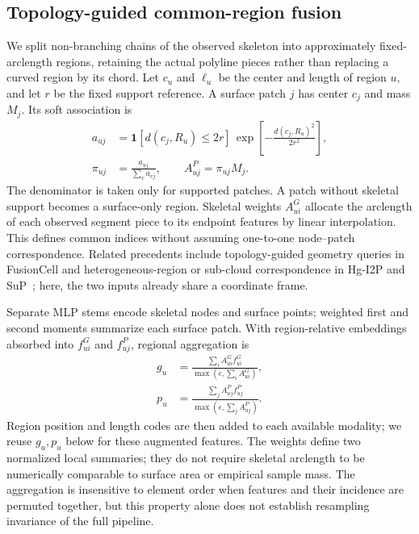 \subsection{Topology-guided common-region fusion}

We split non-branching chains of the observed skeleton into approximately fixed-arclength regions, retaining the actual polyline pieces rather than replacing a curved region by its chord. Let $c_u$ and $\ell_u$ be the center and length of region $u$, and let $r$ be the fixed support reference. A surface patch $j$ has center $c_j$ and mass $M_j$. Its soft association is
\begin{equation}
 \begin{aligned}
 a_{uj}&=\mathbf{1}[d(c_j,R_u)\leq 2r]\,
       \exp\!\left[-\frac{d(c_j,R_u)^2}{2r^2}\right],\\
 \pi_{uj}&=\frac{a_{uj}}{\sum_v a_{vj}},\qquad
 A^P_{uj}=\pi_{uj}M_j .
 \end{aligned}
 \label{eq:incidence}
\end{equation}
The denominator is taken only for supported patches. A patch without skeletal support becomes a surface-only region. Skeletal weights $A^G_{ui}$ allocate the arclength of each observed segment piece to its endpoint features by linear interpolation. This defines common indices without assuming one-to-one node--patch correspondence. Related precedents include topology-guided geometry queries in FusionCell and heterogeneous-region or sub-cloud correspondence in Hg-I2P and SuP~\cite{fusioncell2026,hgi2p2026,sup2026}; here, the two inputs already share a coordinate frame.

Separate MLP stems encode skeletal nodes and surface points; weighted first and second moments summarize each surface patch. With region-relative embeddings absorbed into $f^G_{ui}$ and $f^P_{uj}$, regional aggregation is
\begin{equation}
 \begin{aligned}
 g_u&=\frac{\sum_i A^G_{ui}f^G_{ui}}
              {\max(\epsilon,\sum_i A^G_{ui})},\\
 p_u&=\frac{\sum_j A^P_{uj}f^P_{uj}}
              {\max(\epsilon,\sum_j A^P_{uj})}.
 \end{aligned}
 \label{eq:regional_aggregation}
\end{equation}
Region position and length codes are then added to each available modality; we reuse $g_u,p_u$ below for these augmented features. The weights define two normalized local summaries; they do not require skeletal arclength to be numerically comparable to surface area or empirical sample mass. The aggregation is insensitive to element order when features and their incidence are permuted together, but this property alone does not establish resampling invariance of the full pipeline.

